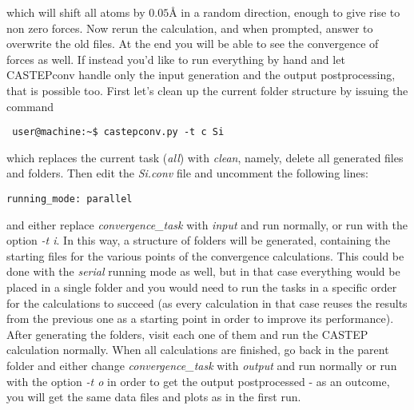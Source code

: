 \documentclass[10pt]{article}
\begin{document}
which will shift all atoms by $0.05 $\AA{} in a random direction, enough to give rise to non zero forces. Now rerun the calculation, and when prompted, answer to overwrite the old files. At the end you will be able to see the convergence of forces as well.\newline
If instead you'd like to run everything by hand and let CASTEPconv handle only the input generation and the output postprocessing, that is possible too. First let's clean up the current folder structure by issuing the command

\begin{lstlisting}
 user@machine:~$ castepconv.py -t c Si
\end{lstlisting}

which replaces the current task (\textit{all}) with \textit{clean}, namely, delete all generated files and folders. Then edit the \textit{Si.conv} file and uncomment the following lines:

\begin{lstlisting}
running_mode: parallel
\end{lstlisting}

and either replace \textit{convergence\_task} with \textit{input} and run normally, or run with the option \textit{-t i}. In this way, a structure of folders will be generated, containing the starting files for the various points of the convergence calculations. This could be done with the \textit{serial} running mode as well, but in that case everything would be placed in a single folder and you would need to run the tasks in a specific order for the calculations to succeed (as every calculation in that case reuses the results from the previous one as a starting point in order to improve its performance). After generating the folders, visit each one of them and run the CASTEP calculation normally. When all calculations are finished, go back in the parent folder and either change \textit{convergence\_task} with \textit{output} and run normally or run with the option \textit{-t o} in order to get the output postprocessed - as an outcome, you will get the same data files and plots as in the first run.
\end{document}
